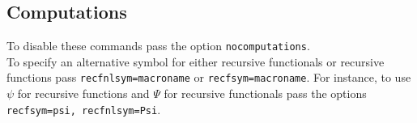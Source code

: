 \documentclass[leqno,11pt]{amsart}
\begin{document}



\subsection{Computations}
To disable these commands pass the option \verb=nocomputations=. \\  To specify an alternative symbol for either recursive functionals or recursive functions pass  \verb!recfnlsym=macroname! or \verb!recfsym=macroname!.  For instance, to use \( \psi \) for recursive functions and \( \Psi \) for recursive functionals pass the options \verb!recfsym=psi, recfnlsym=Psi!.  
\end{document}
